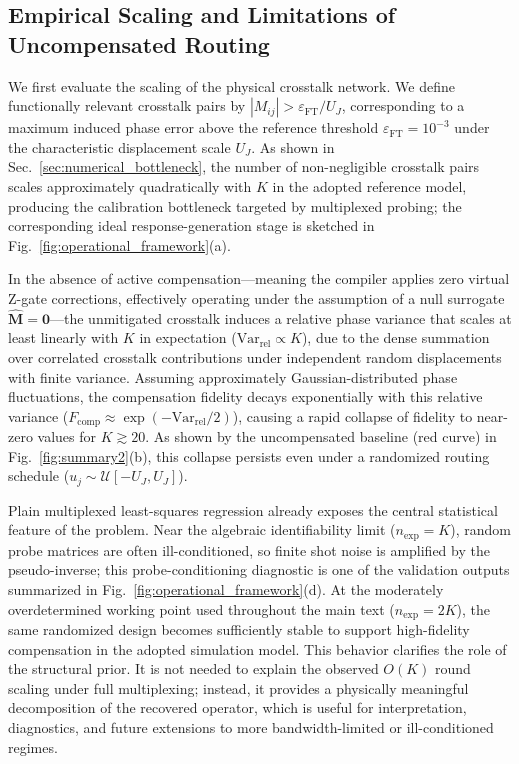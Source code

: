 \documentclass[a4paper,twocolumn,11pt]{quantumarticle}
\begin{document}
\subsection{Empirical Scaling and Limitations of Uncompensated Routing}
\label{sec:naive_failure}

We first evaluate the scaling of the physical crosstalk network. We define functionally relevant crosstalk pairs by $|M_{ij}| > \varepsilon_{\text{FT}}/U_J$, corresponding to a maximum induced phase error above the reference threshold $\varepsilon_{\text{FT}}=10^{-3}$ under the characteristic displacement scale $U_J$. As shown in Sec.~\ref{sec:numerical_bottleneck}, the number of non-negligible crosstalk pairs scales approximately quadratically with $K$ in the adopted reference model, producing the calibration bottleneck targeted by multiplexed probing; the corresponding ideal response-generation stage is sketched in Fig.~\ref{fig:operational_framework}(a).

In the absence of active compensation—meaning the compiler applies zero virtual Z-gate corrections, effectively operating under the assumption of a null surrogate $\hat{\mathbf{M}} = \mathbf{0}$—the unmitigated crosstalk induces a relative phase variance that scales at least linearly with $K$ in expectation ($\text{Var}_{\text{rel}} \propto K$), due to the dense summation over correlated crosstalk contributions under independent random displacements with finite variance. Assuming approximately Gaussian-distributed phase fluctuations, the compensation fidelity decays exponentially with this relative variance ($F_{\text{comp}} \approx \exp(-\text{Var}_{\text{rel}}/2)$), causing a rapid collapse of fidelity to near-zero values for $K \gtrsim 20$. As shown by the uncompensated baseline (red curve) in Fig.~\ref{fig:summary2}(b), this collapse persists even under a randomized routing schedule ($u_j \sim \mathcal{U}[-U_J, U_J]$).

Plain multiplexed least-squares regression already exposes the central statistical feature of the problem. Near the algebraic identifiability limit ($n_{\text{exp}}=K$), random probe matrices are often ill-conditioned, so finite shot noise is amplified by the pseudo-inverse; this probe-conditioning diagnostic is one of the validation outputs summarized in Fig.~\ref{fig:operational_framework}(d). At the moderately overdetermined working point used throughout the main text ($n_{\text{exp}}=2K$), the same randomized design becomes sufficiently stable to support high-fidelity compensation in the adopted simulation model.
This behavior clarifies the role of the structural prior. It is not needed to explain the observed $O(K)$ round scaling under full multiplexing; instead, it provides a physically meaningful decomposition of the recovered operator, which is useful for interpretation, diagnostics, and future extensions to more bandwidth-limited or ill-conditioned regimes.
\end{document}
